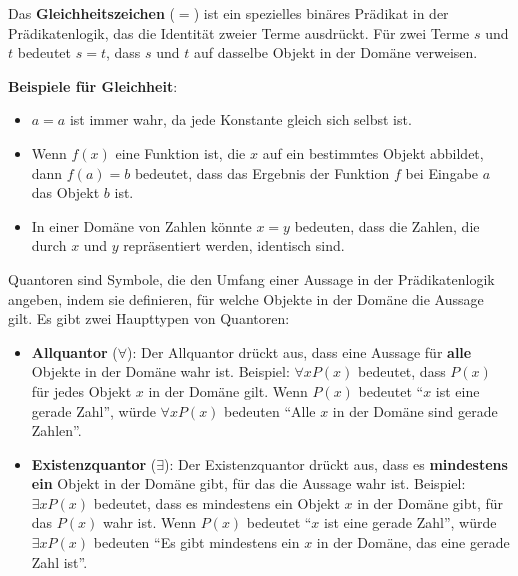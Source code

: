 \documentclass[main.tex]{subfiles}
\begin{document}
\begin{definition}[Gleichheit]
Das \textbf{Gleichheitszeichen} (\(=\)) ist ein spezielles binäres Prädikat in der Prädikatenlogik, das die Identität zweier Terme ausdrückt. Für zwei Terme \(s\) und \(t\) bedeutet \(s = t\), dass \(s\) und \(t\) auf dasselbe Objekt in der Domäne verweisen.

\textbf{Beispiele für Gleichheit}:
\begin{itemize}
    \item \(a = a\) ist immer wahr, da jede Konstante gleich sich selbst ist.
    \item Wenn \(f(x)\) eine Funktion ist, die \(x\) auf ein bestimmtes Objekt abbildet, dann \(f(a) = b\) bedeutet, dass das Ergebnis der Funktion \(f\) bei Eingabe \(a\) das Objekt \(b\) ist.
    \item In einer Domäne von Zahlen könnte \(x = y\) bedeuten, dass die Zahlen, die durch \(x\) und \(y\) repräsentiert werden, identisch sind.
\end{itemize}
\end{definition}


\begin{definition}[Quantoren]
Quantoren sind Symbole, die den Umfang einer Aussage in der Prädikatenlogik angeben, indem sie definieren, für welche Objekte in der Domäne die Aussage gilt. Es gibt zwei Haupttypen von Quantoren:

\begin{itemize}
    \item \textbf{Allquantor} (\(\forall\)): Der Allquantor drückt aus, dass eine Aussage für \textbf{alle} Objekte in der Domäne wahr ist. Beispiel: \(\forall x P(x)\) bedeutet, dass \(P(x)\) für jedes Objekt \(x\) in der Domäne gilt. Wenn \(P(x)\) bedeutet \enquote{\(x\) ist eine gerade Zahl}, würde \(\forall x P(x)\) bedeuten \enquote{Alle \(x\) in der Domäne sind gerade Zahlen}.
    
    \item \textbf{Existenzquantor} (\(\exists\)): Der Existenzquantor drückt aus, dass es \textbf{mindestens ein} Objekt in der Domäne gibt, für das die Aussage wahr ist. Beispiel: \(\exists x P(x)\) bedeutet, dass es mindestens ein Objekt \(x\) in der Domäne gibt, für das \(P(x)\) wahr ist. Wenn \(P(x)\) bedeutet \enquote{\(x\) ist eine gerade Zahl}, würde \(\exists x P(x)\) bedeuten \enquote{Es gibt mindestens ein \(x\) in der Domäne, das eine gerade Zahl ist}.
\end{itemize}
\end{definition}
\end{document}
